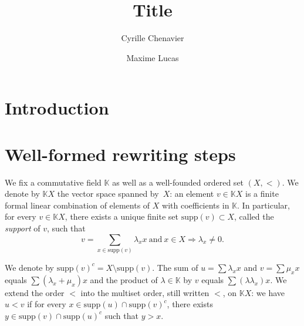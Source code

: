 \documentclass[10pt]{easychair}
\theoremstyle{definition}
\newcommand\K{\mathbb{K}}
\newcommand\KX{\K X}
\newcommand\supp{\text{supp}}
\begin{document}
\title{Title}

\author{
Cyrille Chenavier
\and
Maxime Lucas
}



\maketitle

\begin{abstract}

  
\end{abstract}
 
\section{Introduction}

\section{Well-formed rewriting steps}

We fix a commutative field $\K$ as well as a well-founded ordered set
$(X,<)$. We denote by $\KX$ the vector space spanned by~$X$: an element
$v\in\KX$ is a finite formal linear combination of elements of $X$ with
coefficients in $\K$. In particular, for every $v\in\KX$, there exists a
unique finite set $\supp(v)\subset X$, called the \emph{support} of $v$,
such that
\begin{equation}\label{equ:support}
  v=\sum_{x\in\supp(v)}\lambda_xx\ \text{and}\ x\in X\Rightarrow\lambda_x
  \neq 0.
\end{equation}

\smallskip
\noindent
We denote by $\supp(v)^c=X\setminus\supp(v)$. The sum of
$u=\sum\lambda_xx$ and $v=\sum\mu_xx$ equals $\sum(\lambda_x+\mu_x)x$ and
the product of $\lambda\in\K$ by $v$ equals $\sum(\lambda\lambda_x)x$. We
extend the order $<$ into the multiset order, still written $<$, on
$\KX$: we have $u<v$ if for every $x\in\supp(u)\cap\supp(v)^c$, there
exists $y\in\supp(v)\cap\supp(u)^c$ such that $y>x$.

\medskip
\end{document}
